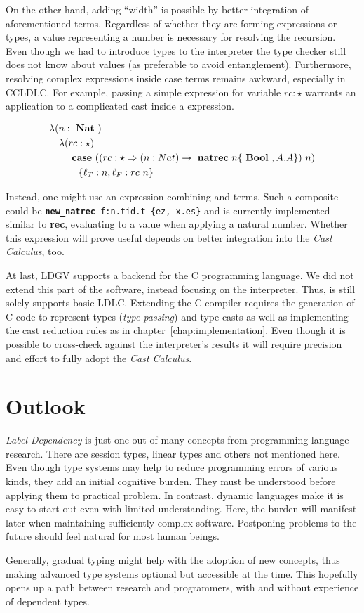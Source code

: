 On the other hand, adding ``width'' is possible by better integration of aforementioned \rec terms. Regardless of whether they are forming expressions or types, a value representing a number is necessary for resolving the recursion. Even though we had to introduce types to the interpreter the type checker still does not know about values (as preferable to avoid entanglement). Furthermore, resolving complex expressions inside case terms remains awkward, especially in CCLDLC. For example, passing a simple \rec expression for variable $rc : \star$ warrants an application to a complicated cast inside a \case expression.

\begin{equation}
\begin{split}
&\lambda (n:\text{ \textbf{Nat} }) \\
&\quad\lambda (rc: \star) \\
&\qquad\text{ \textbf{case} } ((rc : \star \Rightarrow (n:Nat) \rightarrow \text{ \textbf{natrec} } n \{\text{ \textbf{Bool} }, A.A\} )~n) \\
&\quad\qquad \{\ell_T: n, \ell_F: rc~n\}
\end{split}
\end{equation}

Instead, one might use an expression combining \rec and \natrec terms. Such a composite could be \texttt{\textbf{new\_natrec} f:n.tid.t \{ez, x.es\}} and is currently implemented similar to \textbf{rec}, evaluating to a value when applying a natural number. Whether this expression will prove useful depends on better integration into the \emph{Cast Calculus}, too.

At last, LDGV supports a backend for the C programming language. We did not extend this part of the software, instead focusing on the interpreter. Thus, is still solely supports basic LDLC. Extending the C compiler requires the generation of C code to represent types (\emph{type passing}) and type casts as well as implementing the cast reduction rules as in chapter~\ref{chap:implementation}. Even though it is possible to cross-check against the interpreter's results it will require precision and effort to fully adopt the \emph{Cast Calculus}.

\section{Outlook}

\emph{Label Dependency} is just one out of many concepts from programming language research. There are session types, linear types and others not mentioned here. Even though type systems may help to reduce programming errors of various kinds, they add an initial cognitive burden. They must be understood before applying them to practical problem. In contrast, dynamic languages make it is easy to start out even with limited understanding. Here, the burden will manifest later when maintaining sufficiently complex software. Postponing problems to the future should feel natural for most human beings.

Generally, gradual typing might help with the adoption of new concepts, thus making advanced type systems optional but accessible at the time. This hopefully opens up a path between research and programmers, with and without experience of dependent types. 